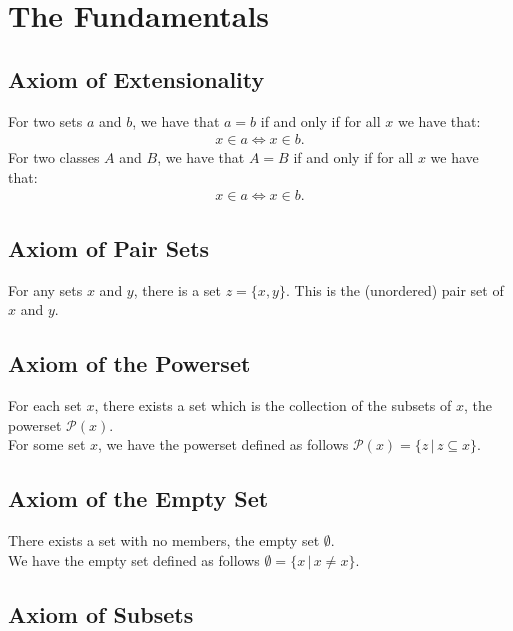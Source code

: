 \section{The Fundamentals}

\subsection{Axiom of Extensionality}

For two sets $a$ and $b$, we have that $a = b$ if and only if for all
$x$ we have that: \begin{align*}
    x \in a \Longleftrightarrow x \in b.
\end{align*} 
For two classes $A$ and $B$, we have that $A = B$ if and only if for all
$x$ we have that: \begin{align*}
    x \in a \Longleftrightarrow x \in b.
\end{align*}

\subsection{Axiom of Pair Sets}

For any sets $x$ and $y$, there is a set $z = \{x, y\}$. This is the
(unordered) pair set of $x$ and $y$.

\subsection{Axiom of the Powerset}

For each set $x$, there exists a set which is the collection of the
subsets of $x$, the powerset $\mathcal{P}(x)$.
\\[\baselineskip]
For some set $x$, we have the powerset defined as follows 
$\mathcal{P}(x) = \{z \, | \, z \subseteq x\}$.

\subsection{Axiom of the Empty Set}

There exists a set with no members, the empty set $\emptyset$.
\\[\baselineskip]
We have the empty set defined as follows 
$\emptyset = \{x \, | \, x \neq x\}$.

\subsection{Axiom of Subsets}

